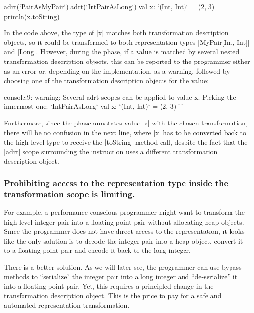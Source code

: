 \begin{lstlisting-nobreak}
adrt(`PairAsMyPair`) {
  adrt(`IntPairAsLong`) {
    val x: `(Int, Int)` = (2, 3)
  }
  println(x.toString)
}
\end{lstlisting-nobreak}

In the code above, the type of |x| matches both transformation description objects, so it could be transformed to both representation types |MyPair[Int, Int]| and |Long|. However, during the \inject{} phase, if a value is matched by several nested transformation description objects, this can be reported to the programmer either as an error or, depending on the implementation, as a warning, followed by choosing one of the transformation description objects for the value:

\begin{lstlisting-nobreak}
console:9:  warning: Several adrt scopes can be applied to value x. Picking the innermost one: `IntPairAsLong`
val x: `(Int, Int)` = (2, 3)
          ^
\end{lstlisting-nobreak}

Furthermore, since the \inject{} phase annotates value |x| with the chosen transformation, there will be no confusion in the next line, where |x| has to be converted back to the high-level type to receive the |toString| method call, despite the fact that the |adrt| scope surrounding the instruction uses a different transformation description object.

\subsubsection{Prohibiting access to the representation type inside the transformation scope is limiting.} For example, a per\-for\-mance-conscious programmer might want to transform the high-level integer pair into a floating-point pair without allocating heap objects. Since the programmer does not have direct access to the representation, it looks like the only solution is to decode the integer pair into a heap object, convert it to a floating-point pair and encode it back to the long integer.

There is a better solution. As we will later see, the programmer can use bypass methods to ``serialize'' the integer pair into a long integer and ``de-serialize'' it into a floating-point pair. Yet, this requires a principled change in the transformation description object. This is the price to pay for a safe and automated representation transformation.

